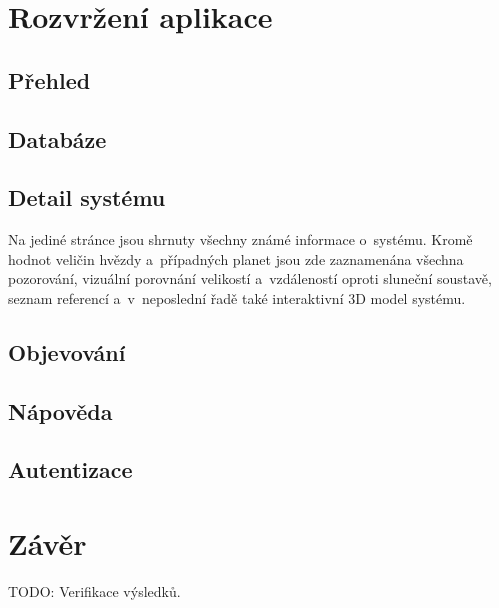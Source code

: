 \documentclass[a4paper,12pt]{article}
\begin{document}
{{{{{{{\section{Rozvržení aplikace}

\subsection{Přehled}

\subsection{Databáze}

\subsection{Detail systému}

Na jediné stránce jsou shrnuty všechny známé informace o~systému. Kromě hodnot veličin hvězdy a~případných planet jsou zde zaznamenána všechna pozorování, vizuální porovnání velikostí a~vzdáleností oproti sluneční soustavě, seznam referencí a~v~neposlední řadě také interaktivní 3D model systému.

\subsection{Objevování}

\subsection{Nápověda}

\subsection{Autentizace}

\clearpage\pagestyle{plain}
\section*{Závěr}

TODO: Verifikace výsledků.

\begin{thebibliography}{99}	%



\end{thebibliography}}}}}}}}
\end{document}
